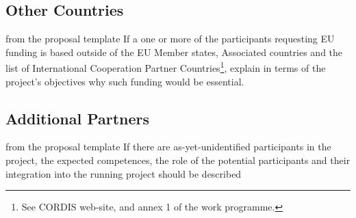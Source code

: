 \subsection{Other Countries}\label{sec:other-countries}
\begin{todo}{from the proposal template}
  If a one or more of the participants requesting EU funding is based outside of the EU
  Member states, Associated countries and the list of International Cooperation Partner
  Countries\footnote{See CORDIS web-site, and annex 1 of the work programme.}, explain in
  terms of the project’s objectives why such funding would be essential.
\end{todo}

\subsection{Additional Partners}\label{sec:assoc-partner}
\begin{todo}{from the proposal template}
  If there are as-yet-unidentified participants in the project, the expected competences,
  the role of the potential participants and their integration into the running project
  should be described
\end{todo}

